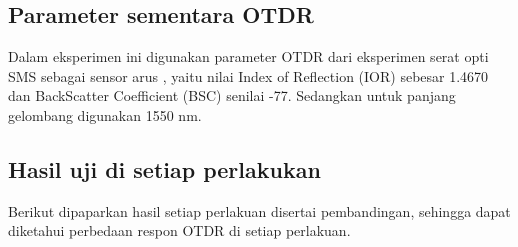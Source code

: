 \documentclass[12pt]{article}
\begin{document}
	\subsection{Parameter sementara OTDR}
	
	Dalam eksperimen ini digunakan parameter OTDR dari eksperimen serat opti SMS sebagai sensor arus \cite{Hafid2014},
	yaitu nilai Index of Reflection (IOR) sebesar 1.4670 dan BackScatter Coefficient (BSC) senilai -77.
	Sedangkan untuk panjang gelombang digunakan 1550 nm. 
	
	\subsection{Hasil uji di setiap perlakukan }
	
	Berikut dipaparkan hasil setiap perlakuan disertai pembandingan, sehingga dapat diketahui perbedaan respon OTDR di setiap perlakuan.
	
\end{document}
